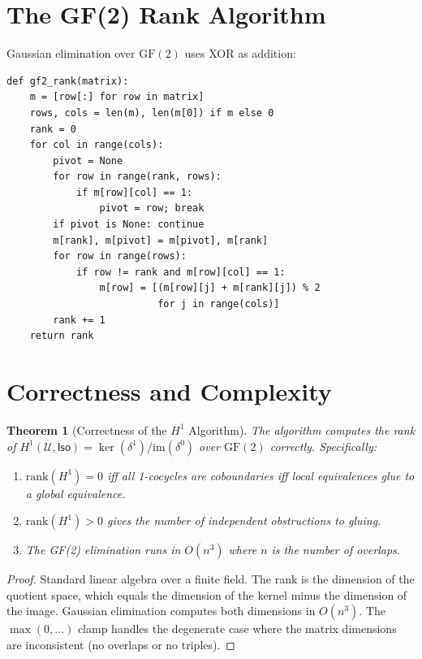 \documentclass[11pt,a4paper]{report}
\theoremstyle{definition}
\theoremstyle{plain}
\newtheorem{theorem}[definition]{Theorem}
\newcommand{\covers}{\mathcal{U}}
\newcommand{\Iso}{\mathsf{Iso}}
\newcommand{\Hone}{H^1}
\begin{document}
\section{The GF(2) Rank Algorithm}

Gaussian elimination over $\mathrm{GF}(2)$ uses XOR as addition:

\begin{lstlisting}[caption={Gaussian elimination over GF(2)}]
def gf2_rank(matrix):
    m = [row[:] for row in matrix]
    rows, cols = len(m), len(m[0]) if m else 0
    rank = 0
    for col in range(cols):
        pivot = None
        for row in range(rank, rows):
            if m[row][col] == 1:
                pivot = row; break
        if pivot is None: continue
        m[rank], m[pivot] = m[pivot], m[rank]
        for row in range(rows):
            if row != rank and m[row][col] == 1:
                m[row] = [(m[row][j] + m[rank][j]) % 2
                          for j in range(cols)]
        rank += 1
    return rank
\end{lstlisting}

\section{Correctness and Complexity}

\begin{theorem}[Correctness of the $\Hone$ Algorithm]
The algorithm computes the rank of $\Hone(\covers, \Iso) =
\ker(\delta^1) / \mathrm{im}(\delta^0)$ over $\mathrm{GF}(2)$
correctly.  Specifically:
\begin{enumerate}
  \item $\mathrm{rank}(\Hone) = 0$ iff all 1-cocycles are
    coboundaries iff local equivalences glue to a global equivalence.
  \item $\mathrm{rank}(\Hone) > 0$ gives the number of independent
    obstructions to gluing.
  \item The GF(2) elimination runs in $O(n^3)$ where $n$ is the
    number of overlaps.
\end{enumerate}
\end{theorem}

\begin{proof}
Standard linear algebra over a finite field.  The rank is the
dimension of the quotient space, which equals the dimension of the
kernel minus the dimension of the image.  Gaussian elimination
computes both dimensions in $O(n^3)$.  The $\max(0, \ldots)$ clamp
handles the degenerate case where the matrix dimensions are
inconsistent (no overlaps or no triples).
\end{proof}
\end{document}
